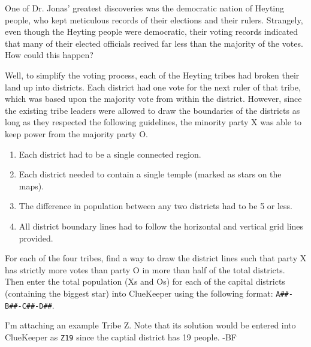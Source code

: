 One of Dr. Jonas' greatest discoveries was the democratic nation
of Heyting people, who kept meticulous records of their elections 
and their rulers.
Strangely, even though the Heyting people were democratic, 
their voting records indicated that many of their elected officials
recived far less than the majority of the votes.
How could this happen?

Well, to simplify the voting process, each of the Heyting tribes had broken their 
land up into districts.
Each district had one vote for the next ruler of that tribe, which was based upon
the majority vote from within the district.
However, since the existing tribe leaders were allowed to draw the boundaries 
of the districts as long as they respected the following guidelines,
the minority party X was able to keep power from the majority party O.
\begin{enumerate}
\item Each district had to be a single connected region.
\item Each district needed to contain a single temple (marked as stars on the maps).
\item The difference in population between any two districts had to be 5 or less.
\item All district boundary lines had to follow the horizontal and vertical grid lines provided.
\end{enumerate}

For each of the four tribes, find a way to draw the district lines such that party X
has strictly more votes than party O in more than half of the total districts.
Then enter the total population (Xs and Os) for each of the capital districts (containing
the biggest star) into
ClueKeeper using the following format: \texttt{A\#\#-B\#\#-C\#\#-D\#\#}.

I'm attaching an example Tribe Z. Note that its solution would be entered into ClueKeeper as \texttt{Z19}
since the captial district has 19 people. -BF

